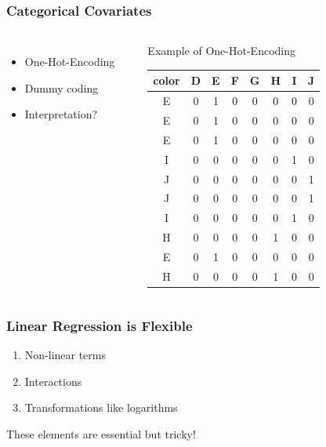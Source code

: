 \documentclass[
    utf8,
    aspectratio=169
]{beamer}  %
\begin{document}
\begin{frame}
	\frametitle{Categorical Covariates}
	\begin{columns}[onlytextwidth]
		\begin{itemize}
			\item One-Hot-Encoding
			\item Dummy coding
			\item Interpretation?
		\end{itemize}
	
		\vspace{1cm}
	
		\begin{example}
		\end{example}
	
		\begin{block}{\centering Example of One-Hot-Encoding}
			\begin{small}
				\begin{table}
					\begin{tabular}{c|ccccccc}
						   color& D& E& F &G&H &I &J \\
				  		\hline
						E  &   0  &   1  &   0  &   0  &   0  &   0  &   0 \\
						E  &   0  &   1  &   0  &   0  &   0  &   0  &   0 \\
						E  &   0  &   1  &   0  &   0  &   0  &   0  &   0 \\
						I  &   0  &   0  &   0  &   0  &   0  &   1  &   0 \\
						J  &   0  &   0  &   0  &   0  &   0  &   0  &   1 \\
						J  &   0  &   0  &   0  &   0  &   0  &   0  &   1 \\
						I  &   0  &   0  &   0  &   0  &   0  &   1  &   0 \\
						H  &   0  &   0  &   0  &   0  &   1  &   0  &   0 \\
						E  &   0  &   1  &   0  &   0  &   0  &   0  &   0 \\
						H  &   0  &   0  &   0  &   0  &   1  &   0  &   0 \\
				     	\hline
					\end{tabular}
				\end{table}
			\end{small}
		\end{block}
	\end{columns}
\end{frame}

\begin{frame}
	\frametitle{Linear Regression is Flexible}
	\begin{enumerate}
		\item Non-linear terms
		\item Interactions
		\item Transformations like logarithms
	\end{enumerate}
	
	\vfill
	
	\begin{alertblock}{These elements are essential but tricky!}
	\end{alertblock}
\end{frame}
\end{document}
